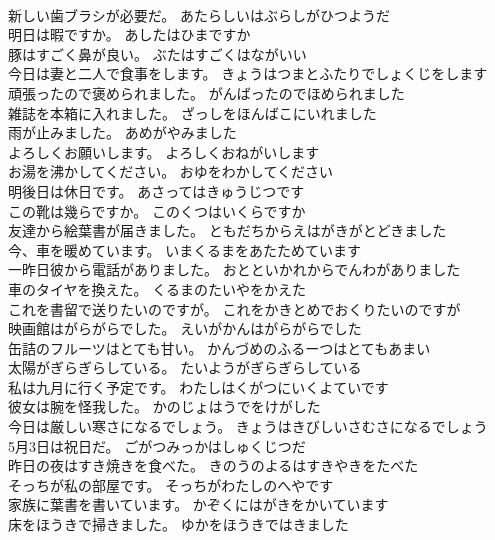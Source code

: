 \documentclass[8pt]{extreport}
\begin{document}
\begin{CJK}{UTF8}{min}
\\	新しい歯ブラシが必要だ。	あたらしいはぶらしがひつようだ 
\\	明日は暇ですか。	あしたはひまですか 
\\	豚はすごく鼻が良い。	ぶたはすごくはながいい 
\\	今日は妻と二人で食事をします。	きょうはつまとふたりでしょくじをします 
\\	頑張ったので褒められました。	がんばったのでほめられました 
\\	雑誌を本箱に入れました。	ざっしをほんばこにいれました 
\\	雨が止みました。	あめがやみました 
\\	よろしくお願いします。	よろしくおねがいします 
\\	お湯を沸かしてください。	おゆをわかしてください 
\\	明後日は休日です。	あさってはきゅうじつです 
\\	この靴は幾らですか。	このくつはいくらですか 
\\	友達から絵葉書が届きました。	ともだちからえはがきがとどきました 
\\	今、車を暖めています。	いまくるまをあたためています 
\\	一昨日彼から電話がありました。	おとといかれからでんわがありました 
\\	車のタイヤを換えた。	くるまのたいやをかえた 
\\	これを書留で送りたいのですが。	これをかきとめでおくりたいのですが 
\\	映画館はがらがらでした。	えいがかんはがらがらでした 
\\	缶詰のフルーツはとても甘い。	かんづめのふるーつはとてもあまい 
\\	太陽がぎらぎらしている。	たいようがぎらぎらしている 
\\	私は九月に行く予定です。	わたしはくがつにいくよていです 
\\	彼女は腕を怪我した。	かのじょはうでをけがした 
\\	今日は厳しい寒さになるでしょう。	きょうはきびしいさむさになるでしょう 
\\	5月3日は祝日だ。	ごがつみっかはしゅくじつだ 
\\	昨日の夜はすき焼きを食べた。	きのうのよるはすきやきをたべた 
\\	そっちが私の部屋です。	そっちがわたしのへやです 
\\	家族に葉書を書いています。	かぞくにはがきをかいています 
\\	床をほうきで掃きました。	ゆかをほうきではきました 

\end{CJK}
\end{document}
